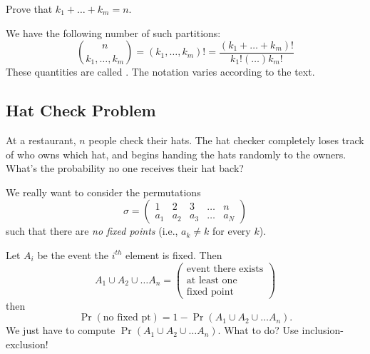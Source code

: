 \begin{xca}
Prove that $k_1+\dots+k_m=n$.
\end{xca}

We have the following number of such partitions:
\begin{equation}
\binom{n}{k_1,\dots,k_m} = (k_1,\dots,k_m)! = \frac{(k_1+\dots+k_m)!}{k_1!(\dots)k_m!}
\end{equation}
These quantities are called .
The notation varies according to the text. 

\subsection{Hat Check Problem}\label{subsec:hatCheckProblem}
At a restaurant, $n$ people check their hats.
The hat checker completely loses track of who owns which hat, and begins
handing the hats randomly to the owners. What's the probability no one
receives their hat back?

\M
We really want to consider the permutations
\begin{equation}
\sigma = \begin{pmatrix} 1 & 2 & 3 & \dots & n\\
a_1 & a_2 & a_3 & \dots & a_N
\end{pmatrix}
\end{equation}
such that there are \emph{no fixed points} (i.e., $a_{k}\neq k$ for
every $k$).

Let $A_{i}$ be the event the $i^{th}$ element is fixed. Then 
\begin{equation}
A_1\cup A_2\cup\dots A_n = \begin{pmatrix}\mbox{event there exists}\\
\mbox{at least one}\\
\mbox{fixed point}
\end{pmatrix}
\end{equation}
then
\begin{equation}
\Pr(\mbox{no fixed pt}) = 1-\Pr(A_1\cup A_2\cup\dots A_n).
\end{equation}
We just have to compute $\Pr(A_1\cup A_2\cup\dots A_n)$. What to do? Use
inclusion-exclusion!


